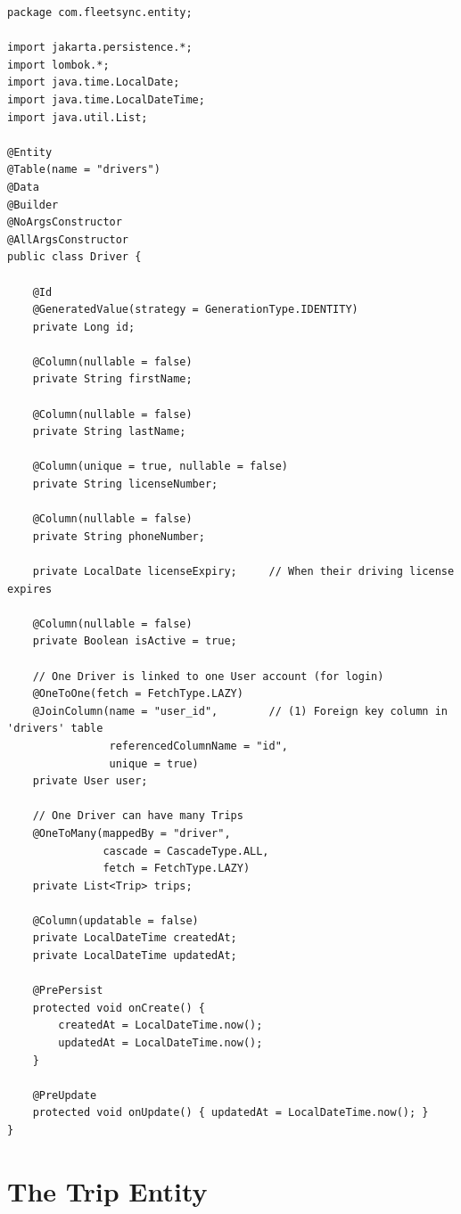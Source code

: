 \documentclass[12pt,a4paper]{report}
\begin{document}
\begin{lstlisting}[caption=Driver.java -- The Driver Entity]
package com.fleetsync.entity;

import jakarta.persistence.*;
import lombok.*;
import java.time.LocalDate;
import java.time.LocalDateTime;
import java.util.List;

@Entity
@Table(name = "drivers")
@Data
@Builder
@NoArgsConstructor
@AllArgsConstructor
public class Driver {

    @Id
    @GeneratedValue(strategy = GenerationType.IDENTITY)
    private Long id;

    @Column(nullable = false)
    private String firstName;

    @Column(nullable = false)
    private String lastName;

    @Column(unique = true, nullable = false)
    private String licenseNumber;

    @Column(nullable = false)
    private String phoneNumber;

    private LocalDate licenseExpiry;     // When their driving license expires

    @Column(nullable = false)
    private Boolean isActive = true;

    // One Driver is linked to one User account (for login)
    @OneToOne(fetch = FetchType.LAZY)
    @JoinColumn(name = "user_id",        // (1) Foreign key column in 'drivers' table
                referencedColumnName = "id",
                unique = true)
    private User user;

    // One Driver can have many Trips
    @OneToMany(mappedBy = "driver",
               cascade = CascadeType.ALL,
               fetch = FetchType.LAZY)
    private List<Trip> trips;

    @Column(updatable = false)
    private LocalDateTime createdAt;
    private LocalDateTime updatedAt;

    @PrePersist
    protected void onCreate() {
        createdAt = LocalDateTime.now();
        updatedAt = LocalDateTime.now();
    }

    @PreUpdate
    protected void onUpdate() { updatedAt = LocalDateTime.now(); }
}
\end{lstlisting}

\section{The Trip Entity}
\end{document}
